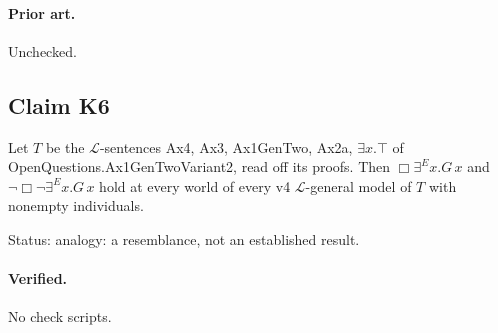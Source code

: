 \documentclass{article}
\begin{document}
\paragraph{Prior art.} Unchecked.

\subsection*{Claim K6}

Let $T$ be the $\mathcal L$-sentences Ax4, Ax3, Ax1GenTwo, Ax2a, $\exists x.\top$ of OpenQuestions.Ax1GenTwoVariant2, read off its proofs. Then $\Box\exists^E x.G\,x$ and $\neg\Box\neg\exists^E x.G\,x$ hold at every world of every v4 $\mathcal L$-general model of $T$ with nonempty individuals.

Status: analogy: a resemblance, not an established result.

\paragraph{Verified.}
No check scripts.
\end{document}
